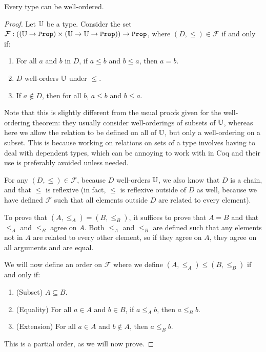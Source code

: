 \documentclass[../math.tex]{subfiles}
\begin{document}
\begin{theorem}
    Every type can be well-ordered.
\end{theorem}
\begin{proof}
    Let $\mathbb{U}$ be a type.  Consider the set $\mathcal F : ((\U \to \Prop) \times
    (\U \to \U \to \Prop)) \to \Prop$, where $(D, \leq) \in \mathcal F$ if and
    only if:
    \begin{enumerate}
        \item For all $a$ and $b$ in $D$, if $a \leq b$ and $b \leq a$, then $a
        = b$.
        \item $D$ well-orders $\mathbb{U}$ under $\leq$.
        \item If $a \notin D$, then for all $b$, $a \leq b$ and $b \leq a$.
    \end{enumerate}
    Note that this is slightly different from the usual proofs given for the
    well-ordering theorem: they usually consider well-orderings of subsets of
    $\mathbb{U}$, whereas here we allow the relation to be defined on all of $\mathbb{U}$, but
    only a well-ordering on a subset.  This is because working on relations on
    sets of a type involves having to deal with dependent types, which can be
    annoying to work with in Coq and their use is preferably avoided unless
    needed.

    For any $(D, \leq) \in \mathcal F$, because $D$ well-orders $\mathbb{U}$, we also
    know that $D$ is a chain, and that $\leq$ is reflexive (in fact, $\leq$ is
    reflexive outside of $D$ as well, because we have defined $\mathcal F$ such
    that all elements outside $D$ are related to every element).

    To prove that $(A, \leq_A) = (B, \leq_B)$, it suffices to prove that $A = B$
    and that $\leq_A$ and $\leq_B$ agree on $A$.  Both $\leq_A$ and $\leq_B$ are
    defined such that any elements not in $A$ are related to every other
    element, so if they agree on $A$, they agree on all arguments and are equal.

    We will now define an order on $\mathcal F$ where we define $(A, \leq_A)
    \leq (B, \leq_B)$ if and only if:
    \begin{enumerate}
        \item (Subset) $A \subseteq B$.
        \item (Equality) For all $a \in A$ and $b \in B$, if $a \leq_A b$, then
        $a \leq_B b$.
        \item (Extension) For all $a \in A$ and $b \notin A$, then $a \leq_B b$.
    \end{enumerate}
    This is a partial order, as we will now prove.


\end{proof}
\end{document}
